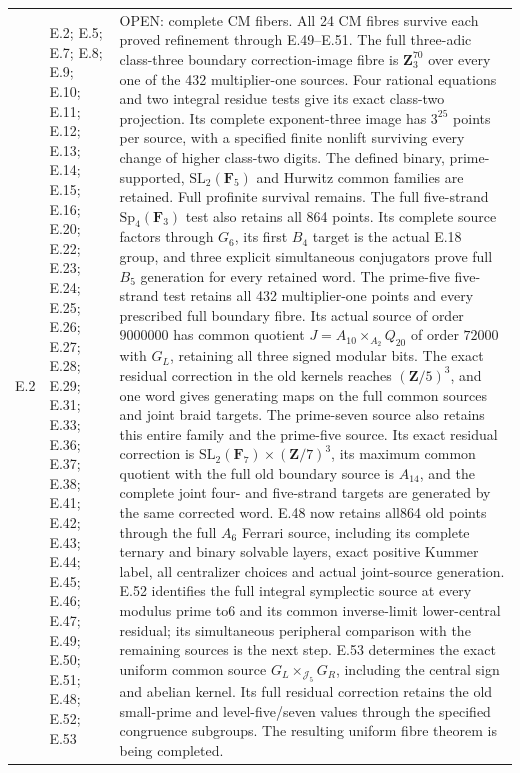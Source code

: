 \begin{longtable}{@{}p{1.1cm}p{3.0cm}p{10.3cm}@{}}
E.2 & E.2; E.5; E.7; E.8; E.9; E.10; E.11; E.12; E.13; E.14; E.15; E.16; E.20; E.22; E.23; E.24; E.25; E.26; E.27; E.28; E.29; E.31; E.33; E.36; E.37; E.38; E.41; E.42; E.43; E.44; E.45; E.46; E.47; E.49; E.50; E.51; E.48; E.52; E.53 & OPEN: complete CM fibers. All 24 CM fibres survive each proved refinement through E.49--E.51. The full three-adic class-three boundary correction-image fibre is $\mathbf Z_3^{70}$ over every one of the 432 multiplier-one sources. Four rational equations and two integral residue tests give its exact class-two projection. Its complete exponent-three image has $3^{25}$ points per source, with a specified finite nonlift surviving every change of higher class-two digits. The defined binary, prime-supported, $\mathrm{SL}_2(\mathbf F_5)$ and Hurwitz common families are retained. Full profinite survival remains. The full five-strand $\mathrm{Sp}_4(\mathbf F_3)$ test also retains all 864 points. Its complete source factors through $G_6$, its first $B_4$ target is the actual E.18 group, and three explicit simultaneous conjugators prove full $B_5$ generation for every retained word. The prime-five five-strand test retains all 432 multiplier-one points and every prescribed full boundary fibre. Its actual source of order $9000000$ has common quotient $J=A_{10}\times_{A_2}Q_{20}$ of order $72000$ with $G_L$, retaining all three signed modular bits. The exact residual correction in the old kernels reaches $(\mathbf Z/5)^3$, and one word gives generating maps on the full common sources and joint braid targets. The prime-seven source also retains this entire family and the prime-five source. Its exact residual correction is $\mathrm{SL}_2(\mathbf F_7)\times(\mathbf Z/7)^3$, its maximum common quotient with the full old boundary source is $A_{14}$, and the complete joint four- and five-strand targets are generated by the same corrected word. E.48 now retains all864 old points through the full $A_6$ Ferrari source, including its complete ternary and binary solvable layers, exact positive Kummer label, all centralizer choices and actual joint-source generation. E.52 identifies the full integral symplectic source at every modulus prime to6 and its common inverse-limit lower-central residual; its simultaneous peripheral comparison with the remaining sources is the next step. E.53 determines the exact uniform common source $G_L\times_{\mathcal J_5}G_R$, including the central sign and abelian kernel. Its full residual correction retains the old small-prime and level-five/seven values through the specified congruence subgroups. The resulting uniform fibre theorem is being completed. \\

\end{longtable}
